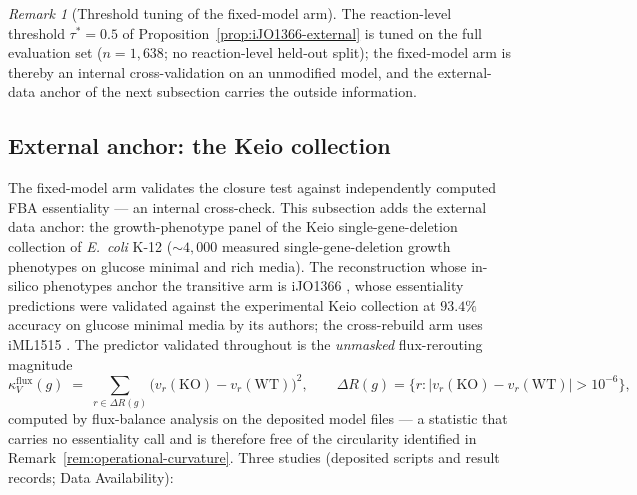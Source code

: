 \documentclass[11pt,a4paper]{article}
\theoremstyle{plain}
\theoremstyle{definition}
\theoremstyle{remark}
\newtheorem{remark}[theorem]{Remark}
\begin{document}
\begin{remark}[Threshold tuning of the fixed-model arm]
\label{rem:ijo-threshold}
The reaction-level threshold $\tau^{*}=0.5$ of
Proposition~\ref{prop:iJO1366-external} is tuned on the full
evaluation set ($n=1{,}638$; no reaction-level held-out split);
the fixed-model arm is thereby an internal cross-validation on an
unmodified model, and the external-data anchor of the next
subsection carries the outside information.
\end{remark}

\subsection{External anchor: the Keio collection}\label{sec:network-keio}

The fixed-model arm validates the closure test against independently
computed FBA essentiality --- an internal cross-check. This
subsection adds the external data anchor: the growth-phenotype
panel of the Keio single-gene-deletion collection of \emph{E.~coli} K-12
\citep{baba2006keio} ($\sim4{,}000$ measured single-gene-deletion
growth phenotypes on glucose minimal and rich media). The
reconstruction whose in-silico phenotypes anchor the transitive arm
is iJO1366 \citep{orth2011ijo1366}, whose essentiality predictions
were validated against the experimental Keio collection at
$93.4\%$ accuracy on glucose minimal media by its authors; the
cross-rebuild arm uses iML1515 \citep{monk2017iml1515}. The
predictor validated throughout is the \emph{unmasked} flux-rerouting
magnitude
\[
  \kappa^{\mathrm{flux}}_V(g) \;=\; \textstyle\sum_{r\in\Delta R(g)}
  \bigl(v_r(\mathrm{KO})-v_r(\mathrm{WT})\bigr)^{2},
  \qquad
  \Delta R(g)=\{r : |v_r(\mathrm{KO})-v_r(\mathrm{WT})|>10^{-6}\},
\]
computed by flux-balance analysis on the deposited model files --- a statistic that
carries no essentiality call and is therefore free of the circularity
identified in Remark~\ref{rem:operational-curvature}. Three studies
(deposited scripts and result records; Data Availability):
\end{document}

